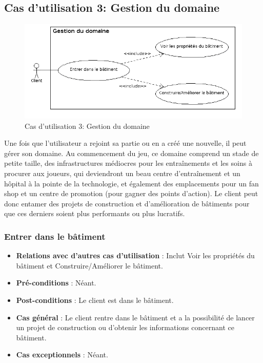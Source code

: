 \documentclass[a4paper,titlepage]{scrreprt}
\begin{document}
 \subsection{Cas d'utilisation 3: Gestion du domaine}
  \begin{figure}[H]
    \center
    \includegraphics[scale=0.5]{uml/useCaseView/GestionDomaine.png}
    \caption{Cas d'utilisation 3: Gestion du domaine}
  \end{figure}  
    Une fois que l'utilisateur a rejoint sa \gls{partie} ou en a créé une nouvelle, il peut gérer son domaine. Au commencement du jeu, ce domaine comprend un stade de petite taille, des infrastructures médiocres pour les entraînements et les soins à procurer aux joueurs, qui deviendront un beau centre d'entraînement et un hôpital à la pointe de la technologie, et également des emplacements pour un fan shop et un centre de promotion (pour gagner des points d'action). Le client peut donc entamer des projets de construction et d'amélioration de bâtiments pour que ces derniers soient plus performants ou plus lucratifs.

    \subsubsection{Entrer dans le bâtiment}
      \begin{itemize}
        \item \textbf{Relations avec d'autres cas d'utilisation}  : Inclut Voir les propriétés du bâtiment et Construire/Améliorer le bâtiment.
        \item \textbf{Pré-conditions} : Néant.
        \item \textbf{Post-conditions} : Le client est dans le bâtiment.
        \item \textbf{Cas général} : Le client rentre dans le bâtiment et a la possibilité de lancer un projet de construction ou d'obtenir les informations concernant ce bâtiment.
        \item \textbf{Cas exceptionnels} : Néant.
      \end{itemize}
\end{document}
